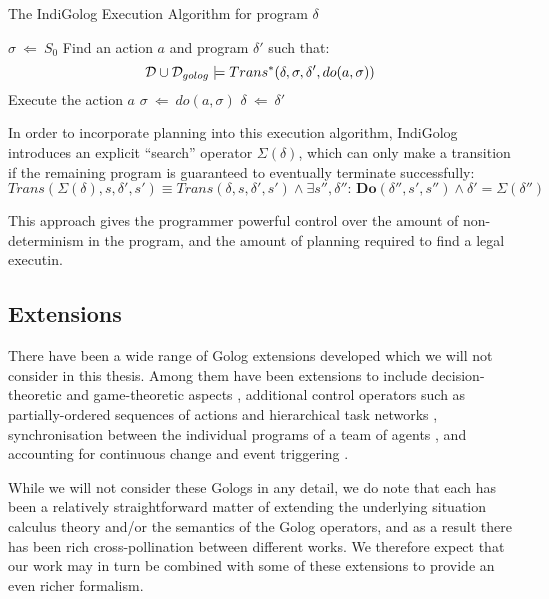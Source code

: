 %
\begin{algorithm}[t]
\caption{The IndiGolog Execution Algorithm for program $\delta$}


\label{alg:indigolog_exec} \begin{algorithmic} \STATE $\sigma\ \Leftarrow\ S_{0}$
 \STATE
Find an action $a$ and program $\delta'$ such that: \[
\mathcal{D}\cup\mathcal{D}_{golog}\models Trans^{*}(\delta,\sigma,\delta',do(a,\sigma))\]
 \STATE Execute the action $a$ \STATE $\sigma\ \Leftarrow\ do(a,\sigma)$
\STATE $\delta\ \Leftarrow\ \delta'$ \ENDWHILE \end{algorithmic} 
\end{algorithm}


In order to incorporate planning into this execution algorithm, IndiGolog
introduces an explicit {}``search'' operator $\Sigma(\delta)$,
which can only make a transition if the remaining program is guaranteed
to eventually terminate successfully:\[
Trans(\Sigma(\delta),s,\delta',s')\equiv Trans(\delta,s,\delta',s')\wedge\exists s'',\delta'':\,\mathbf{Do}(\delta'',s',s'')\wedge\delta'=\Sigma(\delta'')\]


This approach gives the programmer powerful control over the amount
of non-determinism in the program, and the amount of planning required
to find a legal executin.


\subsection{Extensions}

There have been a wide range of Golog extensions developed which we
will not consider in this thesis. Among them have been extensions
to include decision-theoretic \citep{boutilier00dtgolog} and game-theoretic
aspects \citep{finzi03gtgolog,finzi05pogtgolog}, additional control
operators such as partially-ordered sequences of actions \citep{son00htn_golog}
and hierarchical task networks \citep{Gabaldon02htn_in_golog,Son04golog+htn+time},
synchronisation between the individual programs of a team of agents
\citep{farinelli07team_golog}, and accounting for continuous change
and event triggering \citep{grosskreutz00ccgolog}.

While we will not consider these Gologs in any detail, we do note
that each has been a relatively straightforward matter of extending
the underlying situation calculus theory and/or the semantics of the
Golog operators, and as a result there has been rich cross-pollination
between different works. We therefore expect that our work may in
turn be combined with some of these extensions to provide an even
richer formalism.


